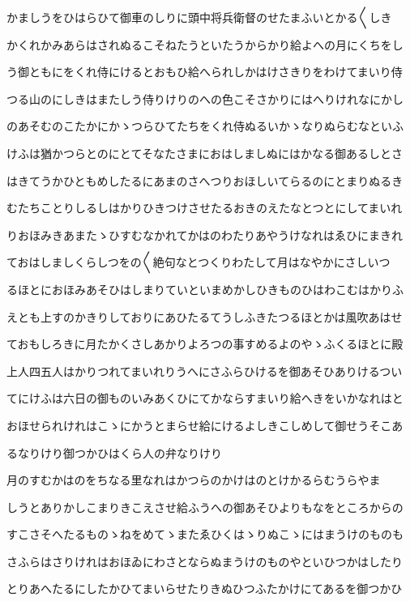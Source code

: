 \documentclass[a4paper,11pt,landscape]{ltjtarticle}
\begin{document}
かましうをひはらひて御車のしりに頭中将兵衛督のせたまふいとかる〱しき
\par\medskip
かくれかみあらはされぬるこそねたうといたうからかり給よへの月にくちをし
\par\medskip
う御ともにをくれ侍にけるとおもひ給へられしかはけさきりをわけてまいり侍
\par\medskip
つる山のにしきはまたしう侍りけりのへの色こそさかりにはへりけれなにかし
\par\medskip
のあそむのこたかにかゝつらひてたちをくれ侍ぬるいかゝなりぬらむなといふ
\par\medskip
けふは猶かつらとのにとてそなたさまにおはしましぬにはかなる御あるしとさ
\par\medskip
はきてうかひともめしたるにあまのさへつりおほしいてらるのにとまりぬるき
\par\medskip
むたちことりしるしはかりひきつけさせたるおきのえたなとつとにしてまいれ
\par\medskip
りおほみきあまたゝひすむなかれてかはのわたりあやうけなれはゑひにまきれ
\par\medskip
ておはしましくらしつをの〱絶句なとつくりわたして月はなやかにさしいつ
\par\medskip
るほとにおほみあそひはしまりていといまめかしひきものひはわこむはかりふ
\par\medskip
えとも上すのかきりしておりにあひたるてうしふきたつるほとかは風吹あはせ
\par\medskip
ておもしろきに月たかくさしあかりよろつの事すめるよのやゝふくるほとに殿
\par\medskip
上人四五人はかりつれてまいれりうへにさふらひけるを御あそひありけるつい
\par\medskip
てにけふは六日の御ものいみあくひにてかならすまいり給へきをいかなれはと
\par\medskip
おほせられけれはこゝにかうとまらせ給にけるよしきこしめして御せうそこあ
\par\medskip
るなりけり御つかひはくら人の弁なりけり
\par\medskip
月のすむかはのをちなる里なれはかつらのかけはのとけかるらむうらやま
\par\medskip
しうとありかしこまりきこえさせ給ふうへの御あそひよりもなをところからの
\par\medskip
すこさそへたるものゝねをめてゝまたゑひくはゝりぬこゝにはまうけのものも
\par\medskip
さふらはさりけれはおほゐにわさとならぬまうけのものやといひつかはしたり
\par\medskip
とりあへたるにしたかひてまいらせたりきぬひつふたかけにてあるを御つかひ
\end{document}
